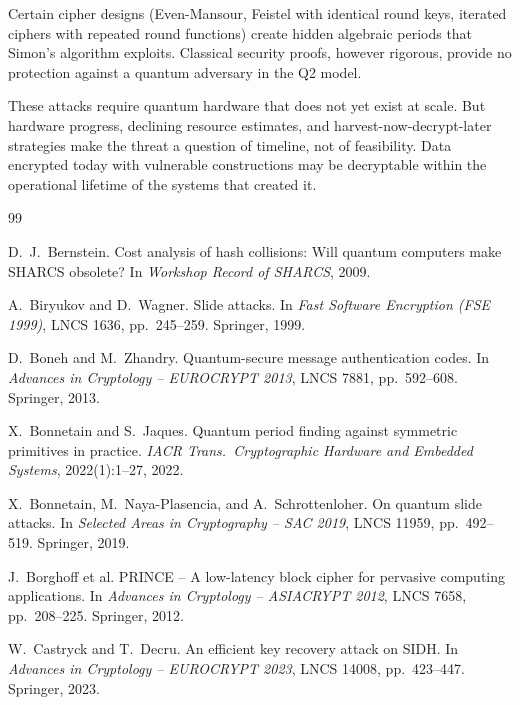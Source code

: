 \documentclass[11pt]{article}
\begin{document}
Certain cipher designs (Even-Mansour, Feistel with identical round keys, iterated ciphers with repeated round functions) create hidden algebraic periods that Simon's algorithm exploits. Classical security proofs, however rigorous, provide no protection against a quantum adversary in the Q2 model.

These attacks require quantum hardware that does not yet exist at scale. But hardware progress, declining resource estimates, and harvest-now-decrypt-later strategies make the threat a question of timeline, not of feasibility. Data encrypted today with vulnerable constructions may be decryptable within the operational lifetime of the systems that created it.


\begin{thebibliography}{99}

D.~J.~Bernstein.
\newblock Cost analysis of hash collisions: Will quantum computers make SHARCS obsolete?
\newblock In \emph{Workshop Record of SHARCS}, 2009.

A.~Biryukov and D.~Wagner.
\newblock Slide attacks.
\newblock In \emph{Fast Software Encryption (FSE 1999)}, LNCS 1636, pp.~245--259. Springer, 1999.

D.~Boneh and M.~Zhandry.
\newblock Quantum-secure message authentication codes.
\newblock In \emph{Advances in Cryptology -- EUROCRYPT 2013}, LNCS 7881, pp.~592--608. Springer, 2013.

X.~Bonnetain and S.~Jaques.
\newblock Quantum period finding against symmetric primitives in practice.
\newblock \emph{IACR Trans.\ Cryptographic Hardware and Embedded Systems}, 2022(1):1--27, 2022.

X.~Bonnetain, M.~Naya-Plasencia, and A.~Schrottenloher.
\newblock On quantum slide attacks.
\newblock In \emph{Selected Areas in Cryptography -- SAC 2019}, LNCS 11959, pp.~492--519. Springer, 2019.

J.~Borghoff et al.
\newblock PRINCE -- A low-latency block cipher for pervasive computing applications.
\newblock In \emph{Advances in Cryptology -- ASIACRYPT 2012}, LNCS 7658, pp.~208--225. Springer, 2012.

W.~Castryck and T.~Decru.
\newblock An efficient key recovery attack on SIDH.
\newblock In \emph{Advances in Cryptology -- EUROCRYPT 2023}, LNCS 14008, pp.~423--447. Springer, 2023.


\end{thebibliography}
\end{document}
